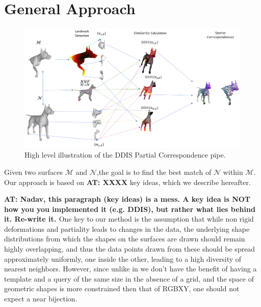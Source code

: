 \documentclass[10pt,twocolumn,letterpaper]{article}
\newcommand{\colornote}[3]{{\color{#1}\bf{#2: #3}\normalfont}}
\newcommand{\colornote}[3]{}
\newcommand {\ayellet}[1]{\colornote{blue}{AT}{#1}}
\begin{document}
\section{General Approach}
\label{sec:algorithm}
\begin{figure}[htb]
	\centering
	\includegraphics[width=1\textwidth]{figures/Birds_Flight.png}
	\caption{High level illustration of the DDIS Partial Correspondence pipe.}
\end{figure}

Given two surfaces $\mathcal{M}$ and $\mathcal{N}$,the goal is to find the best match of  $\mathcal{N}$ within  $\mathcal{M}$.
Our approach is based on \ayellet{XXXX} key ideas, which we describe hereafter.

\ayellet{Nadav, this paragraph (key ideas) is a mess. 
A key idea is NOT how you you implemented it (e.g. DDIS), but rather what lies behind it.
Re-write it.
}
One key to our method is the assumption that while non rigid deformations and partiality leads to changes in the data, the underlying shape distributions from which the shapes on the surfaces are drawn should remain highly overlapping, and thus the data points drawn from these should be spread approximately uniformly, one inside the other, leading to a high diversity of nearest neighbors.
However, since unlike in\cite{talmi2017template} we don't have the benefit of having a template and a query of the same size in the absence of a grid, and the space of geometric shapes is more constrained then that of RGBXY, one should not expect a near bijection. 
\end{document}
